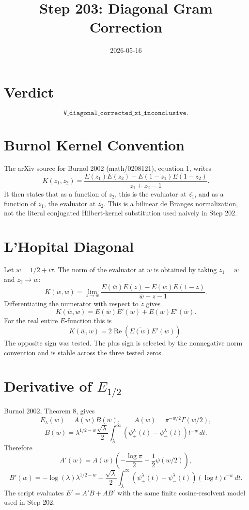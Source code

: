 \documentclass[11pt]{article}
\title{Step 203: Diagonal Gram Correction}
\date{2026-05-16}
\begin{document}
\maketitle

\section*{Verdict}
\[
\boxed{\texttt{V\_diagonal\_corrected\_xi\_inconclusive}.}
\]

\section*{Burnol Kernel Convention}

The arXiv source for Burnol 2002 (math/0208121), equation 1, writes
\[
K(z_1,z_2)=
\frac{E(z_1)E(z_2)-E(1-z_1)E(1-z_2)}{z_1+z_2-1}.
\]
It then states that as a function of \(z_2\), this is the evaluator at
\(\overline{z_1}\), and as a function of \(z_1\), the evaluator at
\(\overline{z_2}\).  This is a bilinear de Branges normalization, not the
literal conjugated Hilbert-kernel substitution used naively in Step 202.

\section*{L'Hopital Diagonal}

Let \(w=1/2+i\tau\).  The norm of the evaluator at \(w\) is obtained by
taking \(z_1=\overline w\) and \(z_2\to w\):
\[
K(\overline w,w)
=\lim_{z\to w}
\frac{E(\overline w)E(z)-E(w)E(1-z)}{\overline w+z-1}.
\]
Differentiating the numerator with respect to \(z\) gives
\[
K(\overline w,w)
=E(\overline w)E'(w)+E(w)E'(\overline w).
\]
For the real entire \(E\)-function this is
\[
\boxed{K(\overline w,w)=2\operatorname{Re}\left(\overline{E(w)}E'(w)\right)}.
\]
The opposite sign was tested.  The plus sign is selected by the nonnegative
norm convention and is stable across the three tested zeros.

\section*{Derivative of \(E_{1/2}\)}

Burnol 2002, Theorem 8, gives
\[
E_\lambda(w)=A(w)B(w),\qquad
A(w)=\pi^{-w/2}\Gamma(w/2),
\]
\[
B(w)=\lambda^{1/2-w}
\frac{\sqrt\lambda}{2}\int_\lambda^\infty
(\psi_+^\lambda(t)-\psi_-^\lambda(t))t^{-w}\,dt.
\]
Therefore
\[
A'(w)=A(w)\left(-\frac{\log\pi}{2}+\frac{1}{2}\psi(w/2)\right),
\]
\[
B'(w)=
-\log(\lambda)\lambda^{1/2-w}
-\frac{\sqrt\lambda}{2}\int_\lambda^\infty
(\psi_+^\lambda(t)-\psi_-^\lambda(t))(\log t)t^{-w}\,dt.
\]
The script evaluates \(E'=A'B+AB'\) with the same finite cosine-resolvent
model used in Step 202.
\end{document}
